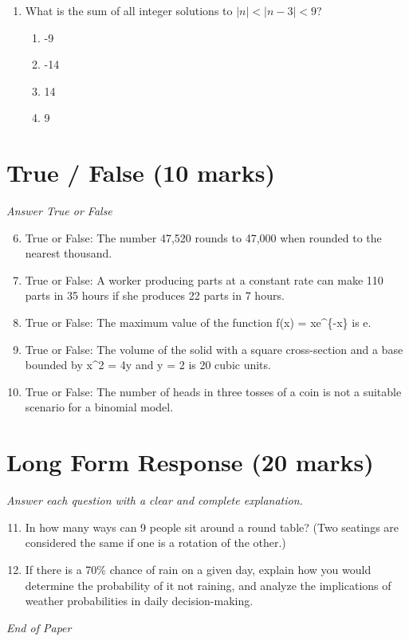 \documentclass[12pt]{article}
\begin{document}
\begin{enumerate}[label=\arabic*.]
\begin{enumerate}[label=(\alph*)]
    \item All the numbers in the pattern can be divided equally by 4.
    \item All the numbers in the pattern can be divided equally by 8.
    \item All the numbers in the pattern can be divided equally by 7.
\end{enumerate}
\item What is the sum of all integer solutions to $|n| < |n-3| < 9$?
\begin{enumerate}[label=(\alph*)]
    \item -9
    \item -14
    \item 14
    \item 9
\end{enumerate}
\end{enumerate}

\section*{True / False (10 marks)}
\textit{Answer True or False}
\begin{enumerate}[label=\arabic*.]
\setcounter{enumi}{5}
\item True or False: The number 47,520 rounds to 47,000 when rounded to the nearest thousand.
\item True or False: A worker producing parts at a constant rate can make 110 parts in 35 hours if she produces 22 parts in 7 hours.
\item True or False: The maximum value of the function f(x) = xe\^{}\{-x\} is e.
\item True or False: The volume of the solid with a square cross-section and a base bounded by x\^{}2 = 4y and y = 2 is 20 cubic units.
\item True or False: The number of heads in three tosses of a coin is not a suitable scenario for a binomial model.
\end{enumerate}

\section*{Long Form Response (20 marks)}
\textit{Answer each question with a clear and complete explanation.}
\begin{enumerate}[label=\arabic*.]
\setcounter{enumi}{10}
\item In how many ways can 9 people sit around a round table? (Two seatings are considered the
same if one is a rotation of the other.)
\item If there is a 70\% chance of rain on a given day, explain how you would determine the
probability of it not raining, and analyze the implications of weather probabilities in
daily decision-making.
\end{enumerate}

\vfill
\noindent\textit{End of Paper}
\end{document}

